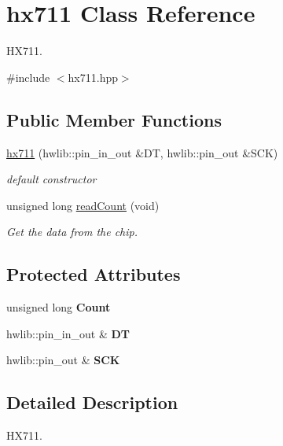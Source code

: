 \hypertarget{classhx711}{}\section{hx711 Class Reference}
\label{classhx711}


H\+X711.  




{\ttfamily \#include $<$hx711.\+hpp$>$}

\subsection*{Public Member Functions}
\begin{DoxyCompactItemize}
\item 
\hyperlink{classhx711_a3676f13c54b3a63e36390fe48eb24b91}{hx711} (hwlib\+::pin\+\_\+in\+\_\+out \&DT, hwlib\+::pin\+\_\+out \&S\+CK)
\begin{DoxyCompactList}\small\item\em default constructor \end{DoxyCompactList}\item 
unsigned long \hyperlink{classhx711_ad1d55443d9cd3d4250c48a7fcd2fac09}{read\+Count} (void)
\begin{DoxyCompactList}\small\item\em Get the data from the chip. \end{DoxyCompactList}\end{DoxyCompactItemize}
\subsection*{Protected Attributes}
\begin{DoxyCompactItemize}
\item 
\mbox{\label{classhx711_a0bd9a837c0fc4a0b132f428ef721e749}} 
unsigned long {\bfseries Count}
\item 
\mbox{\label{classhx711_a0778c016e210a13294deda11ddd2caed}} 
hwlib\+::pin\+\_\+in\+\_\+out \& {\bfseries DT}
\item 
\mbox{\label{classhx711_a4c193bacb6ee392981e3fe9b3e8e2264}} 
hwlib\+::pin\+\_\+out \& {\bfseries S\+CK}
\end{DoxyCompactItemize}


\subsection{Detailed Description}
H\+X711. 

